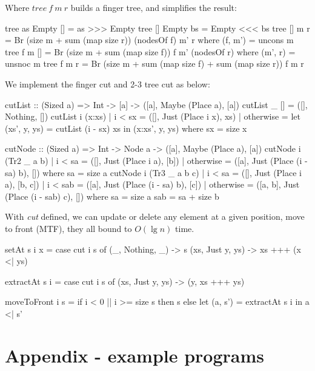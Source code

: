 \documentclass[b5paper]{article}
\begin{document}
\begin{Answer}[ref = {ex:finger-tree-index}]
{Where $tree\ f\ m\ r$ builds a finger tree, and simplifies the result:

\begin{Haskell}
tree as Empty [] = as >>> Empty
tree [] Empty bs = Empty <<< bs
tree [] m r = Br (size m + sum (map size r)) (nodesOf f) m' r
    where (f, m') = uncons m
tree f m [] = Br (size m + sum (map size f)) f m' (nodesOf r)
    where (m', r) = unsnoc m
tree f m r = Br (size m + sum (map size f) + sum (map size r)) f m r
\end{Haskell}

We implement the finger cut and 2-3 tree cut as below:

\begin{Haskell}
cutList :: (Sized a) => Int -> [a] -> ([a], Maybe (Place a), [a])
cutList _ [] = ([], Nothing, [])
cutList i (x:xs) | i < sx = ([], Just (Place i x), xs)
                 | otherwise = let (xs', y, ys) = cutList (i - sx) xs
                               in (x:xs', y, ys)
  where sx = size x

cutNode :: (Sized a) => Int -> Node a -> ([a], Maybe (Place a), [a])
cutNode i (Tr2 _ a b) | i < sa = ([], Just (Place i a), [b])
                      | otherwise = ([a], Just (Place (i - sa) b), [])
  where sa = size a
cutNode i (Tr3 _ a b c) | i < sa = ([], Just (Place i a), [b, c])
                        | i < sab = ([a], Just (Place (i - sa) b), [c])
                        | otherwise = ([a, b], Just (Place (i - sab) c), [])
  where sa = size a
        sab = sa + size b
\end{Haskell}

With \textit{cut} defined, we can update or delete any element at a given position, move to front (MTF), they all bound to $O(\lg n)$ time.

\begin{Haskell}
setAt s i x = case cut i s of
  (_, Nothing, _) -> s
  (xs, Just y, ys) -> xs +++ (x <| ys)

extractAt s i = case cut i s of (xs, Just y, ys) -> (y, xs +++ ys)

moveToFront i s = if i < 0 || i >= size s then s
                  else let (a, s') = extractAt s i in a <| s'
\end{Haskell}
}
\end{Answer}

\section{Appendix - example programs}
\end{document}
